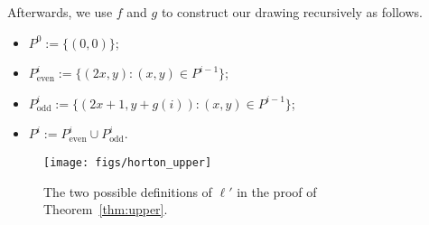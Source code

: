 \documentclass{article}
\begin{document}
Afterwards, we use $f$ and $g$ to construct our drawing recursively as follows.

\begin{itemize}
 \item $P^0:=\{(0,0)\}$;
 
 \item $P_{\textrm{even}}^i:= \{(2x,y):(x,y)\in P^{i-1} \}$; 
 
 \item $P_{\textrm{odd}}^i:=\{ (2x+1,y+g(i)):(x,y)\in P^{i-1}\}$;
 
 \item $P^i:=P_{\textrm{even}}^i \cup P_{\textrm{odd}}^i$.
 
\end{itemize}

\begin{figure}
\begin{center}
\texttt{[image: figs/horton\_upper]}
\end{center}
\caption{The two possible definitions of $\ell'$ in the proof of Theorem~\ref{thm:upper}.}
\label{fig:horton_upper}
\end{figure}
\end{document}
